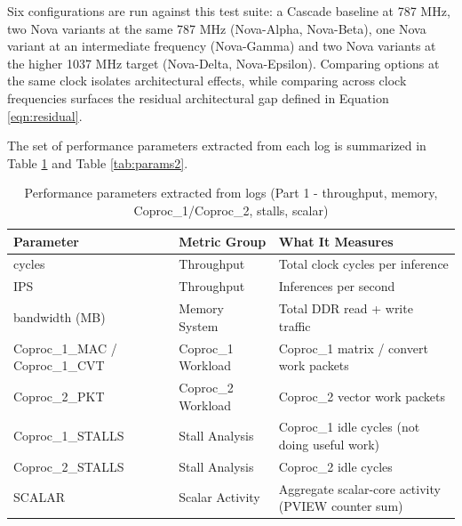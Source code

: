 Six configurations are run against this test suite: a Cascade baseline at 787 MHz, two Nova variants at the same 787 MHz (Nova-Alpha, Nova-Beta), one Nova variant at an intermediate frequency (Nova-Gamma) and two Nova variants at the higher 1037 MHz target (Nova-Delta, Nova-Epsilon). Comparing options at the same clock isolates architectural effects, while comparing across clock frequencies surfaces the residual architectural gap defined in Equation \ref{eqn:residual}.

The set of performance parameters extracted from each log is summarized in Table \ref{tab:params1} and Table \ref{tab:params2}.

\begin{table}[htb]
\fontsize{10}{12}\selectfont
\centering
\caption{Performance parameters extracted from logs (Part 1 - throughput, memory, Coproc\_1/Coproc\_2, stalls, scalar)}
\label{tab:params1}
\begin{tabular}{|p{4cm}|p{3.5cm}|p{6cm}|}
\hline
\textbf{Parameter} & \textbf{Metric Group} & \textbf{What It Measures}\\
\hline
cycles & Throughput & Total clock cycles per inference\\\hline
IPS & Throughput & Inferences per second\\\hline
bandwidth (MB) & Memory System & Total DDR read + write traffic\\\hline
Coproc\_1\_MAC / Coproc\_1\_CVT & Coproc\_1 Workload & Coproc\_1 matrix / convert work packets\\\hline
Coproc\_2\_PKT & Coproc\_2 Workload & Coproc\_2 vector work packets\\\hline
Coproc\_1\_STALLS & Stall Analysis & Coproc\_1 idle cycles (not doing useful work)\\\hline
Coproc\_2\_STALLS & Stall Analysis & Coproc\_2 idle cycles\\\hline
SCALAR & Scalar Activity & Aggregate scalar-core activity (PVIEW counter sum)\\
\hline
\end{tabular}
\end{table}

